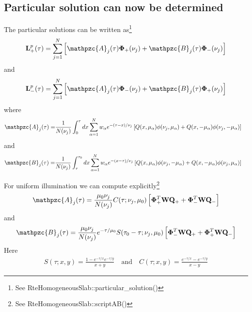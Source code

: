 \documentclass[11pt]{article}
\newcommand{\mvec}[1]{\mathbf{#1}}
\newcommand{\gvec}[1]{\boldsymbol{#1}}
\newcommand{\script}[1]{\mathpzc{#1}}
\begin{document}
\subsection{Particular solution can now be determined}
The particular solutions can be written as\footnote{See
  RteHomogeneousSlab::particular\_solution()}
\begin{align}
  \mvec{L}^p_+(\tau) = \sum_{j=1}^N
  \left[
    \script{A}_j(\tau) \gvec{\Phi}_+(\nu_j) +
    \script{B}_j(\tau) \gvec{\Phi}_-(\nu_j)
  \right]
\end{align}
and
\begin{align}
  \mvec{L}^p_-(\tau) = \sum_{j=1}^N
  \left[
    \script{A}_j(\tau) \gvec{\Phi}_-(\nu_j) +
    \script{B}_j(\tau) \gvec{\Phi}_+(\nu_j)
  \right]
\end{align}
where
\begin{align}
  \script{A}_j(\tau) = &\frac{1}{N(\nu_j)}
  \int_0^\tau dx
  \sum_{\alpha=1}^N w_\alpha e^{-(\tau-x)/\nu_j}
  \left[
    Q(x,\mu_\alpha)\phi(\nu_j,\mu_\alpha) +
    Q(x,-\mu_\alpha)\phi(\nu_j,-\mu_\alpha)
  \right]
\end{align}
and
\begin{align}
  \script{B}_j(\tau) = &\frac{1}{N(\nu_j)}
  \int_\tau^{\tau_0} dx
  \sum_{\alpha=1}^N w_\alpha e^{-(x-\tau)/\nu_j}
  \left[
    Q(x,\mu_\alpha)\phi(\nu_j,-\mu_\alpha) +
    Q(x,-\mu_\alpha)\phi(\nu_j,\mu_\alpha)
  \right]
\end{align}


For uniform illumination we can compute explicitly\footnote{See
  RteHomogeneousSlab::scriptAB()}
\begin{align}
  \script{A}_j(\tau) = \frac{\mu_0 \nu_j}{N(\nu_j)}
  C(\tau ; \nu_j, \mu_0)
  \left[
    \gvec{\Phi}_+^T \mvec{W} \mvec{Q}_+ +
    \gvec{\Phi}_-^T \mvec{W} \mvec{Q}_-
  \right]
\end{align}
and
\begin{align}
  \script{B}_j(\tau) = \frac{\mu_0 \nu_j}{N(\nu_j)}
  e^{-\tau/\mu_0}S(\tau_0-\tau ; \nu_j, \mu_0)
  \left[
    \gvec{\Phi}_-^T \mvec{W} \mvec{Q}_+ +
    \gvec{\Phi}_+^T \mvec{W} \mvec{Q}_-
  \right]
\end{align}
Here
\begin{align}
  S(\tau;x,y) = \frac{1-e^{-\tau/x}e^{-\tau/y}}{x+y} \quad\textrm{and}\quad
  C(\tau;x,y) = \frac{e^{-\tau/x}-e^{-\tau/y}}{x-y}
\end{align}
\end{document}
